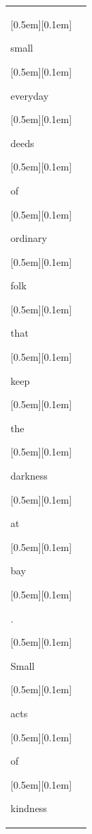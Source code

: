 \begin{table}[ht]
\begin{tabular}{@{}l p{13cm}@{}}
{\setlength{\fboxsep}{1pt}\raisebox{0pt}[0.5em][0.1em]{\colorbox{Salmon!60}{\strut{ small}}}}{\setlength{\fboxsep}{1pt}\raisebox{0pt}[0.5em][0.1em]{\colorbox{Salmon!60}{\strut{ everyday}}}}{\setlength{\fboxsep}{1pt}\raisebox{0pt}[0.5em][0.1em]{\colorbox{Salmon!60}{\strut{ deeds}}}}{\setlength{\fboxsep}{1pt}\raisebox{0pt}[0.5em][0.1em]{\colorbox{SkyBlue!55}{\strut{ of}}}}{\setlength{\fboxsep}{1pt}\raisebox{0pt}[0.5em][0.1em]{\colorbox{Salmon!60}{\strut{ ordinary}}}}{\setlength{\fboxsep}{1pt}\raisebox{0pt}[0.5em][0.1em]{\colorbox{Salmon!60}{\strut{ folk}}}}{\setlength{\fboxsep}{1pt}\raisebox{0pt}[0.5em][0.1em]{\colorbox{Salmon!60}{\strut{ that}}}}{\setlength{\fboxsep}{1pt}\raisebox{0pt}[0.5em][0.1em]{\colorbox{Salmon!60}{\strut{ keep}}}}{\setlength{\fboxsep}{1pt}\raisebox{0pt}[0.5em][0.1em]{\colorbox{SkyBlue!55}{\strut{ the}}}}{\setlength{\fboxsep}{1pt}\raisebox{0pt}[0.5em][0.1em]{\colorbox{Salmon!60}{\strut{ darkness}}}}{\setlength{\fboxsep}{1pt}\raisebox{0pt}[0.5em][0.1em]{\colorbox{SkyBlue!55}{\strut{ at}}}}{\setlength{\fboxsep}{1pt}\raisebox{0pt}[0.5em][0.1em]{\colorbox{DarkOrchid!25}{\strut{ bay}}}}{\setlength{\fboxsep}{1pt}\raisebox{0pt}[0.5em][0.1em]{\colorbox{DarkOrchid!25}{\strut{.}}}}{\setlength{\fboxsep}{1pt}\raisebox{0pt}[0.5em][0.1em]{\colorbox{Salmon!60}{\strut{ Small}}}}{\setlength{\fboxsep}{1pt}\raisebox{0pt}[0.5em][0.1em]{\colorbox{Salmon!60}{\strut{ acts}}}}{\setlength{\fboxsep}{1pt}\raisebox{0pt}[0.5em][0.1em]{\colorbox{SkyBlue!55}{\strut{ of}}}}{\setlength{\fboxsep}{1pt}\raisebox{0pt}[0.5em][0.1em]{\colorbox{Salmon!60}{\strut{ kindness}}}}


\end{tabular}
\end{table}
